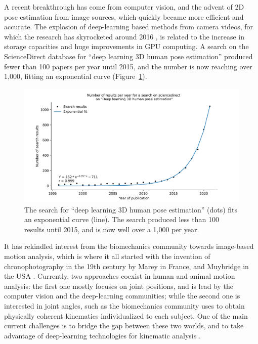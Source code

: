 A recent breakthrough has come from computer vision, and the advent of 2D pose estimation from image sources, which quickly became more efficient and accurate. The explosion of deep-learning based methods from camera videos, for which the research has skyrocketed around 2016 \cite{Wang2021a}, is related to the increase in storage capacities and huge improvements in GPU computing. A search on the ScienceDirect database for “deep learning 3D human pose estimation” produced fewer than 100 papers per year until 2015, and the number is now reaching over 1,000, fitting an exponential curve (Figure~\ref{fig_exp}).

\clearpage
\begin{figure}[hbtp]
	\centering
	\def\svgwidth{1\columnwidth}
	\fontsize{10pt}{10pt}\selectfont
	\includegraphics[width=\linewidth]{"../Chap1/Figures/Fig_Exp.png"}
	\caption{The search for “deep learning 3D human pose estimation” (dots) fits an exponential curve (line). The search produced less than 100 results until 2015, and is now well over a 1,000 per year.}
	\label{fig_exp}
\end{figure}

It has rekindled interest from the biomechanics community towards image-based motion analysis, which is where it all started with the invention of chronophotography in the 19th century by Marey in France, and Muybridge in the USA \cite{Baker2007}. Currently, two approaches coexist in human and animal motion analysis: the first one mostly focuses on joint positions, and is lead by the computer vision and the deep-learning communities; while the second one is interested in joint angles, such as the biomechanics community uses to obtain physically coherent kinematics individualized to each subject. One of the main current challenges is to bridge the gap between these two worlds, and to take advantage of deep-learning technologies for kinematic analysis \cite{Cronin2021,Seethapathi2019}. 

